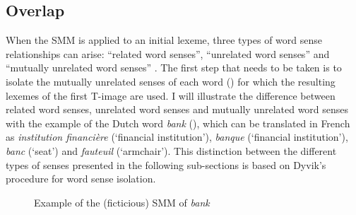 \subsection{Overlap}
\label{sec:3.4.3}
When the SMM is applied to an initial lexeme, three types of word sense relationships can arise: “related word senses”, “unrelated word senses” and “mutually unrelated word senses” \citep[32]{langemets_translations_2005}. The first step that needs to be taken is to isolate the mutually unrelated senses of each word (\citeyear[32]{langemets_translations_2005}) for which the resulting lexemes of the first T-image are used. I will illustrate the difference between related word senses, unrelated word senses and mutually unrelated word senses with the example of the Dutch word \textit{bank} (), which can be translated in French as \textit{institution financière} (`financial institution'), \textit{banque} (`financial institution'), \textit{banc} (`seat') and \textit{fauteuil} (`armchair'). This distinction between the different types of senses presented in the following sub-sections is based on Dyvik’s procedure for word sense isolation.

\begin{figure}\scriptsize
\caption{\label{fig:3:9}Example of the (ficticious) SMM of \textit{bank}}
\end{figure}

